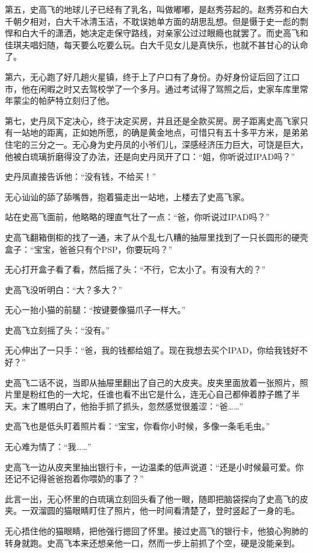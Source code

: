 第五，史高飞的地球儿子已经有了乳名，叫做嘟嘟，是赵秀芬起的。赵秀芬和白大千朝夕相对，白大千冰清玉洁，不耽误她单方面的胡思乱想。但是慑于史一彪的剽悍和白大千的潇洒，她决定走保守路线，对亲家公过过眼瘾也就罢了。而史高飞和佳琪夫唱妇随，每天要么吃要么玩。白大千见女儿是真快乐，也就不甚甘心的认命了。

第六，无心跑了好几趟火星镇，终于上了户口有了身份。办好身份证后回了江口市，他在闲暇之时又去驾校学了一个多月。通过考试得了驾照之后，史家车库里常年蒙尘的帕萨特立刻归了他。

第七，史丹凤下定决心，终于决定买房，并且还是全款买房。房子距离史高飞家只有一站地的距离，正如她所愿，的确是黄金地点，可惜只有五十多平方米，是弟弟住宅的三分之一。无心身为史丹凤的小爷们儿，深感经济压力巨大，可饶是巨大，他被白琉璃折磨得没了办法，还是向史丹凤开了口：``姐，你听说过IPAD吗？''

史丹凤直接告诉他：``没有钱，不给买！''

无心讪讪的舔了舔嘴唇，抱着猫走出一站地，上楼去了史高飞家。

站在史高飞面前，他略略的理直气壮了一点：``爸，你听说过IPAD吗？''

史高飞翻箱倒柜的找了一通，末了从个乱七八糟的抽屉里找到了一只长圆形的硬壳盒子：``宝宝，爸爸只有个PSP，你要玩吗？''

无心打开盒子看了看，然后摇了头：``不行，它太小了。有没有大的？''

史高飞没听明白：``大？多大？''

无心一抬小猫的前腿：``按键要像猫爪子一样大。''

史高飞立刻摇了头：``没有。''

无心伸出了一只手：``爸，我的钱都给姐了。现在我想去买个IPAD，你给我钱好不好？''

史高飞二话不说，当即从抽屉里翻出了自己的大皮夹。皮夹里面放着一张照片，照片里是粉红色的一大坨，任谁也看不出它是什么，连无心自己都伸着脖子瞧了半天。末了瞧明白了，他抬手抓了抓头，忽然感觉很羞涩：``爸\ldots{}\ldots{}''

史高飞也是低头盯着照片看：``宝宝，你看你小时候，多像一条毛毛虫。''

无心难为情了：``我\ldots{}\ldots{}''

史高飞一边从皮夹里抽出银行卡，一边温柔的低声说道：``还是小时候最可爱。你还记不记得爸爸抱着你喂奶的事了？''

此言一出，无心怀里的白琉璃立刻回头看了他一眼，随即把脑袋探向了史高飞的皮夹。一双溜圆的猫眼睛盯住了照片，他一时间看清楚了，登时竖起了一身的毛。

无心捂住他的猫眼睛，把他强行摁回了怀里。接过史高飞的银行卡，他狼心狗肺的转身就跑。史高飞本来还想亲他一口，然而一步上前抓了个空，硬是没能亲到。


